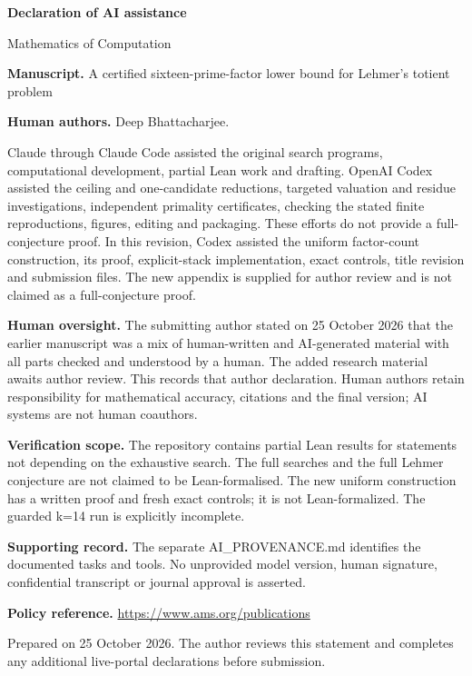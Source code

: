 \documentclass[11pt]{article}
\begin{document}
{\Large\bfseries\color{ink} Declaration of AI assistance}\par
Mathematics of Computation\par{}\par\medskip
\textbf{Manuscript.} A certified sixteen-prime-factor lower bound for Lehmer's totient problem\par

\textbf{Human authors.} Deep Bhattacharjee.\par

Claude through Claude Code assisted the original search programs, computational development, partial Lean work and drafting. OpenAI Codex assisted the ceiling and one-candidate reductions, targeted valuation and residue investigations, independent primality certificates, checking the stated finite reproductions, figures, editing and packaging. These efforts do not provide a full-conjecture proof. In this revision, Codex assisted the uniform factor-count construction, its proof, explicit-stack implementation, exact controls, title revision and submission files. The new appendix is supplied for author review and is not claimed as a full-conjecture proof.\par

\textbf{Human oversight.} The submitting author stated on 25 October 2026 that the earlier manuscript was a mix of human-written and AI-generated material with all parts checked and understood by a human. The added research material awaits author review. This records that author declaration. Human authors retain responsibility for mathematical accuracy, citations and the final version; AI systems are not human coauthors.\par

\textbf{Verification scope.} The repository contains partial Lean results for statements not depending on the exhaustive search. The full searches and the full Lehmer conjecture are not claimed to be Lean-formalised. The new uniform construction has a written proof and fresh exact controls; it is not Lean-formalized. The guarded k=14 run is explicitly incomplete.\par

\textbf{Supporting record.} The separate AI\_PROVENANCE.md identifies the documented tasks and tools. No unprovided model version, human signature, confidential transcript or journal approval is asserted.\par

\textbf{Policy reference.} \url{https://www.ams.org/publications}\par

{\small Prepared on 25 October 2026. The author reviews this statement and completes any additional live-portal declarations before submission.}
\end{document}
